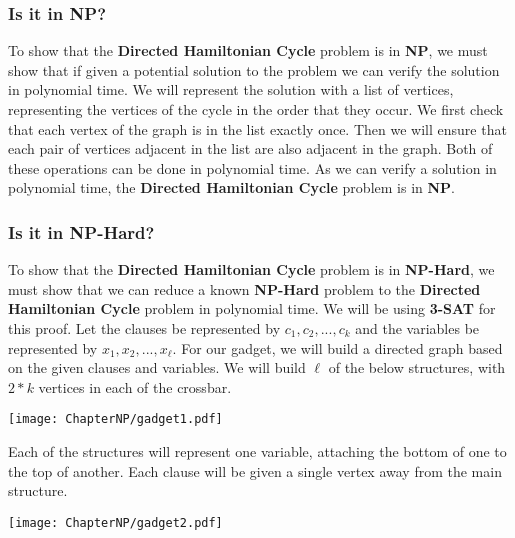     \subsubsection{Is it in NP?}
        To show that the \textbf{Directed Hamiltonian Cycle} problem is in \textbf{NP}, we must show that if given a potential solution to the problem we can verify the solution in polynomial time. We will represent the solution with a list of vertices, representing the vertices of the cycle in the order that they occur. We first check that each vertex of the graph is in the list exactly once. Then we will ensure that each pair of vertices adjacent in the list are also adjacent in the graph. Both of these operations can be done in polynomial time. As we can verify a solution in polynomial time, the \textbf{Directed Hamiltonian Cycle} problem is in \textbf{NP}.
    \subsubsection{Is it in NP-Hard?}
        To show that the \textbf{Directed Hamiltonian Cycle} problem is in \textbf{NP-Hard}, we must show that we can reduce a known \textbf{NP-Hard} problem to the \textbf{Directed Hamiltonian Cycle} problem in polynomial time. We will be using \textbf{3-SAT} for this proof. Let the clauses be represented by $c_1, c_2, ..., c_k$ and the variables be represented by $x_1, x_2, ..., x_\ell$. For our gadget, we will build a directed graph based on the given clauses and variables. We will build $\ell$ of the below structures, with $2*k$ vertices in each of the crossbar. 
        \begin{center}
            \texttt{[image: ChapterNP/gadget1.pdf]}
        \end{center}
        Each of the structures will represent one variable, attaching the bottom of one to the top of another. Each clause will be given a single vertex away from the main structure.
        \begin{center}
            \texttt{[image: ChapterNP/gadget2.pdf]}
        \end{center}







